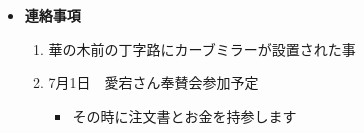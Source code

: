 \documentclass{jarticle}
\begin{document}
{\begin{itemize}
\begin{enumerate}
              \begin{itemize}
               \item その対応について
              \end{itemize}
        \item 自治会費余剰金の用途について
              \begin{itemize}
               \item アンケート作成？→項目について等
              \end{itemize}
        \item 緊急連絡カードの再検討について
       \end{enumerate}
 \item {\bf 連絡事項}
       \begin{enumerate}
        \item 華の木前の丁字路にカーブミラーが設置された事
        \item 7月1日　愛宕さん奉賛会参加予定
              \begin{itemize}
               \item その時に注文書とお金を持参します
              \end{itemize}
       \end{enumerate}
\end{itemize}
}
\end{document}
